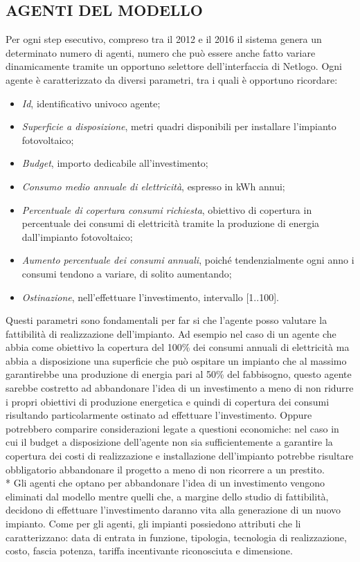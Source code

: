 \documentclass[12pt,a4paper,openright,twoside]{report}
\begin{document}
\subsection{AGENTI DEL MODELLO}
Per ogni step esecutivo, compreso tra il 2012 e il 2016 il sistema genera un determinato numero di agenti, numero che può essere anche fatto variare dinamicamente tramite un opportuno selettore dell'interfaccia di Netlogo. Ogni agente è caratterizzato da diversi parametri, tra i quali è opportuno ricordare:
\begin{itemize}
\item \emph{Id}, identificativo univoco agente;
\item \emph{Superficie a disposizione}, metri quadri disponibili per installare l'impianto fotovoltaico;
\item \emph{Budget}, importo dedicabile all'investimento;
\item \emph{Consumo medio annuale di elettricità}, espresso in kWh annui;
\item \emph{Percentuale di copertura consumi richiesta}, obiettivo di copertura in percentuale dei consumi di elettricità tramite la produzione di energia dall'impianto fotovoltaico;
\item \emph{Aumento percentuale dei consumi annuali}, poiché tendenzialmente ogni anno i consumi tendono a variare, di solito aumentando;
\item \emph{Ostinazione}, nell'effettuare l'investimento, intervallo [1..100].
\end{itemize}
Questi parametri sono fondamentali per far si che l'agente posso valutare la fattibilità di realizzazione dell'impianto. Ad esempio nel caso di un agente che abbia come obiettivo la copertura del 100\% dei consumi annuali di elettricità ma abbia a disposizione una superficie che può ospitare un impianto che al massimo garantirebbe una produzione di energia pari al 50\% del fabbisogno, questo agente sarebbe costretto ad abbandonare l'idea di un investimento a meno di non ridurre i propri obiettivi di produzione energetica e quindi di copertura dei consumi risultando particolarmente ostinato ad effettuare l'investimento. Oppure potrebbero comparire considerazioni legate a questioni economiche: nel caso in cui il budget a disposizione dell'agente non sia sufficientemente a garantire la copertura dei costi di realizzazione e installazione dell'impianto potrebbe risultare obbligatorio abbandonare il progetto a meno di non ricorrere a un prestito. \\*
Gli agenti che optano per abbandonare l'idea di un investimento vengono eliminati dal modello mentre quelli che, a margine dello studio di fattibilità, decidono di effettuare l'investimento daranno vita alla generazione di un nuovo impianto. Come per gli agenti, gli impianti possiedono attributi che li caratterizzano: data di entrata in funzione, tipologia, tecnologia di realizzazione, costo, fascia potenza, tariffa incentivante riconosciuta e dimensione.
\end{document}
